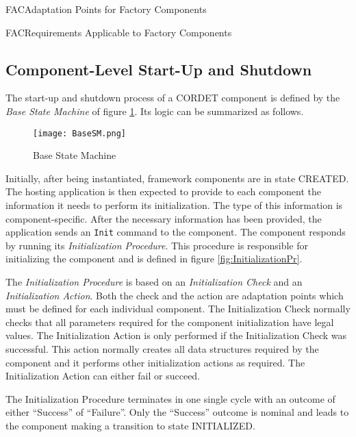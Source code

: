 \documentclass{pnp_article}
\begin{document}
\begin{crAp}{FAC}{Adaptation Points for Factory Components}
\end{crAp}

\begin{crReq}{FAC}{Requirements Applicable to Factory Components}
\end{crReq}



\subsection{Component-Level Start-Up and Shutdown}\label{sec:BaseCmp}
The start-up and shutdown process of a CORDET component is defined by the \textit{Base State Machine} of figure \ref{fig:BaseSM}. Its logic can be summarized as follows.

\begin{figure}[ht]
 \centering
 \texttt{[image: BaseSM.png]}
 \caption{Base State Machine}
 \label{fig:BaseSM}
\end{figure}

Initially, after being instantiated, framework components are in state CREATED. 
The hosting application is then expected to provide to each component the information it needs to perform its initialization. 
The type of this information is component-specific. 
After the necessary information has been provided, the application sends an \texttt{Init} command to the component. 
The component responds by running its \textit{Initialization Procedure}. 
This procedure is responsible for initializing the component and is defined in figure  \ref{fig:InitializationPr}. 

The \textit{Initialization Procedure} is based on an \textit{Initialization Check} and an \textit{Initialization Action}. 
Both the check and the action are adaptation points which must be defined for each individual component. 
The Initialization Check normally checks that all parameters required for the component initialization have legal values. 
The Initialization Action is only performed if the Initialization Check was successful. 
This action normally creates all data structures required by the component and it performs other initialization actions as required. 
The Initialization Action can either fail or succeed.

The Initialization Procedure terminates in one single cycle with an outcome of either “Success” of “Failure”. 
Only the “Success” outcome is nominal and leads to the component making a transition to state INITIALIZED.
\end{document}
